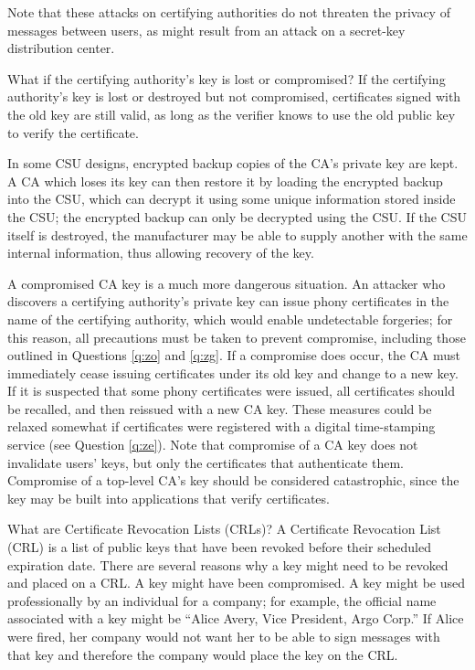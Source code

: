 Note that these attacks on certifying authorities do not threaten the 
privacy of messages between users, as might result from an attack on a 
secret-key distribution center.

{What if the certifying authority's key is lost or compromised? }
If the certifying authority's key is lost or destroyed but not compromised, 
certificates signed with the old key are still valid, as long as the verifier
knows to use the old public key to verify the certificate. 

In some CSU designs, encrypted backup copies of the CA's private key are
kept. A CA which loses its key can then restore it by loading the encrypted 
backup into the CSU, which can decrypt it using some unique information 
stored inside the CSU; the encrypted backup can only be decrypted using the 
CSU. If the CSU itself is destroyed, the manufacturer may be able to supply 
another with the same internal information, thus allowing recovery of the key. 

A compromised CA key is a much more dangerous situation. An attacker who 
discovers a certifying authority's private key can issue phony certificates 
in the name of the certifying authority, which would enable undetectable 
forgeries; for this reason, all precautions must be taken to prevent 
compromise, including those outlined in Questions \ref{q:zo} and \ref{q:zg}. 
If a compromise does occur, the CA must immediately cease issuing certificates
under its old key and change to a new key. If it is suspected that some phony 
certificates were issued, all certificates should be recalled, and then 
reissued with a new CA key. These measures could be relaxed somewhat 
if certificates were registered with a digital time-stamping 
service (see Question \ref{q:ze}). Note that compromise of a CA key does not 
invalidate users' keys, but only the certificates that authenticate them. 
Compromise of a top-level CA's key should be considered catastrophic, since 
the key may be built into applications that verify certificates.

{What are Certificate Revocation Lists (CRLs)?}
A Certificate Revocation List (CRL) is a list of public keys that have been 
revoked before their scheduled expiration date. There are several reasons why 
a key might need to be revoked and placed on a CRL. A key might have been 
compromised. A key might be used professionally by an individual for 
a company; for example, the official name associated with a key might be 
``Alice Avery, Vice President, Argo Corp.'' If Alice were fired, her company 
would not want her to be able to sign messages with that key and therefore 
the company would place the key on the CRL. 

